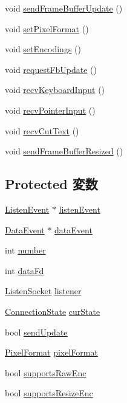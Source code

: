 \begin{DoxyCompactItemize}
void \hyperlink{classVncServer_a12fdf8396c8fe33bb93e66d7491fb497}{sendFrameBufferUpdate} ()
\item 
void \hyperlink{classVncServer_ad52ea030be3bb8b536f8a7f87b709319}{setPixelFormat} ()
\item 
void \hyperlink{classVncServer_a840599118004b7df093bd78b6a21e56b}{setEncodings} ()
\item 
void \hyperlink{classVncServer_a83f5ce82a666e5b948e2a14b430633ce}{requestFbUpdate} ()
\item 
void \hyperlink{classVncServer_adce913e2d5283f60780d7becd1d3e44b}{recvKeyboardInput} ()
\item 
void \hyperlink{classVncServer_a95d4cde3a9b92bbac5871d8b475eedd3}{recvPointerInput} ()
\item 
void \hyperlink{classVncServer_a7ee4399f42b127e68135272ff77815c2}{recvCutText} ()
\item 
void \hyperlink{classVncServer_a046eae8a3566418d4f03a95de5d1af13}{sendFrameBufferResized} ()
\end{DoxyCompactItemize}
\subsection*{Protected 変数}
\begin{DoxyCompactItemize}
\item 
\hyperlink{classVncServer_1_1ListenEvent}{ListenEvent} $\ast$ \hyperlink{classVncServer_ad7f258b1b869b6152bc5040c38b79d39}{listenEvent}
\item 
\hyperlink{classVncServer_1_1DataEvent}{DataEvent} $\ast$ \hyperlink{classVncServer_a7a8501aba170bc353fe057e372612b93}{dataEvent}
\item 
int \hyperlink{classVncServer_a7106e2abc437ad981830d14176d15f09}{number}
\item 
int \hyperlink{classVncServer_ab9f945d843e004fbbb155b7709051470}{dataFd}
\item 
\hyperlink{classListenSocket}{ListenSocket} \hyperlink{classVncServer_acf9ea448b26a541b4a197f1ca92f700b}{listener}
\item 
\hyperlink{group__VncConstants_gacdd867d72142510ce53521a63a062f9b}{ConnectionState} \hyperlink{classVncServer_ad0bc1d6a87b76d47489ca919f3ae51ca}{curState}
\item 
bool \hyperlink{classVncServer_ab2b958eb553dde858c8737b57614e87d}{sendUpdate}
\item 
\hyperlink{structVncInput_1_1PixelFormat}{PixelFormat} \hyperlink{classVncServer_a126e69cd1de897ecc9b84e858e4809c7}{pixelFormat}
\item 
bool \hyperlink{classVncServer_a1286ea1dbf0c332e14ccfc0267de405e}{supportsRawEnc}
\item 
bool \hyperlink{classVncServer_a68ae35695f8a6dcd68d9ff80dee28736}{supportsResizeEnc}
\end{DoxyCompactItemize}
